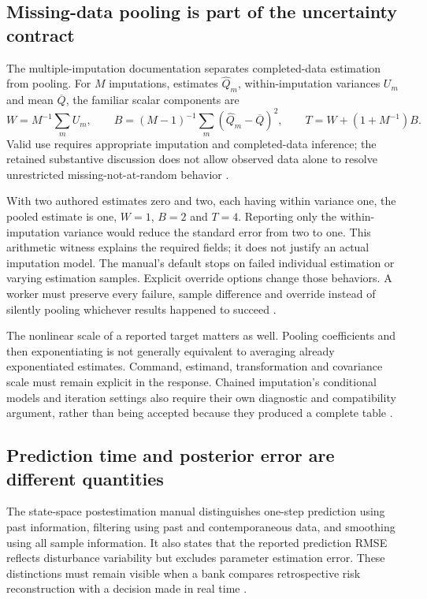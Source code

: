 \subsection{Missing-data pooling is part of the uncertainty contract}
The multiple-imputation documentation separates completed-data estimation
from pooling. For $M$ imputations, estimates $\widehat Q_m$, within-imputation
variances $U_m$ and mean $\overline Q$, the familiar scalar components are
\[
 W=M^{-1}\sum_m U_m,\qquad
 B=(M-1)^{-1}\sum_m(\widehat Q_m-\overline Q)^2,\qquad
 T=W+(1+M^{-1})B.
\]
Valid use requires appropriate imputation and completed-data inference;
the retained substantive discussion does not allow observed data alone to
resolve unrestricted missing-not-at-random behavior
\cite{exec21_transport_stata_estimate,exec21_transport_stata_substantive}.

With two authored estimates zero and two, each having within variance one,
the pooled estimate is one, $W=1$, $B=2$ and $T=4$. Reporting only the
within-imputation variance would reduce the standard error from two to
one. This arithmetic witness explains the required fields; it does not
justify an actual imputation model. The manual's default stops on failed
individual estimation or varying estimation samples. Explicit override
options change those behaviors. A worker must preserve every failure,
sample difference and override instead of silently pooling whichever
results happened to succeed \cite{exec21_transport_stata_estimate,
exec24_stata_choice}.

The nonlinear scale of a reported target matters as well. Pooling
coefficients and then exponentiating is not generally equivalent to
averaging already exponentiated estimates. Command, estimand, transformation
and covariance scale must remain explicit in the response. Chained
imputation's conditional models and iteration settings also require their
own diagnostic and compatibility argument, rather than being accepted
because they produced a complete table
\cite{exec21_transport_stata_estimate,exec21_transport_stata_chained,
exec24_stata_choice}.

\subsection{Prediction time and posterior error are different quantities}
The state-space postestimation manual distinguishes one-step prediction
using past information, filtering using past and contemporaneous data, and
smoothing using all sample information. It also states that the reported
prediction RMSE reflects disturbance variability but excludes parameter
estimation error. These distinctions must remain visible when a bank
compares retrospective risk reconstruction with a decision made in real
time \cite{exec22_state_stata_sspace_post}.

